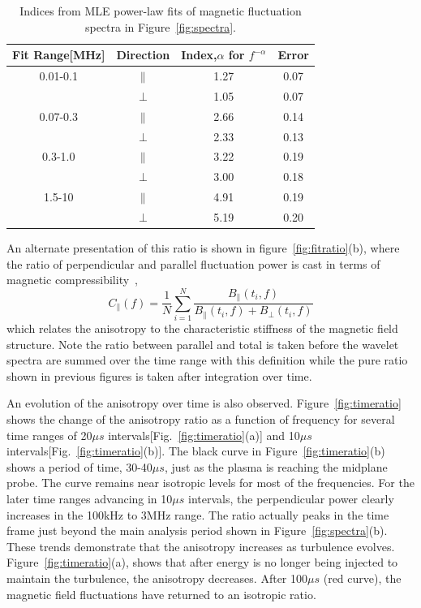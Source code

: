 \documentclass[aip,prl,amsmath,amssymb,reprint,superscriptaddress]{revtex4-1} %
\begin{document}
\begin{table}
\caption{\label{tab:Bindices}Indices from MLE power-law fits of magnetic fluctuation spectra in Figure~\ref{fig:spectra}.}
\begin{tabular}{cccc}
\toprule
Fit Range[MHz]	&	Direction		&	Index,$\alpha$ for $f^{-\alpha}$	&Error\\
\hline
0.01-0.1				& $\parallel$	& 1.27															&0.07\\
								& $\perp$			& 1.05  														&0.07\\
\hline
0.07-0.3				& $\parallel$	& 2.66															&0.14\\
								& $\perp$			& 2.33  														&0.13\\
\hline
0.3-1.0					& $\parallel$	& 3.22															&0.19\\
								& $\perp$			& 3.00  														&0.18\\
\hline
1.5-10					& $\parallel$	& 4.91															&0.19\\
								& $\perp$			& 5.19  														&0.20\\
\hline
\end{tabular}
\end{table}

An alternate presentation of this ratio is shown in figure~\ref{fig:fitratio}(b), where the ratio of perpendicular and parallel fluctuation power is cast in terms of magnetic compressibility~\cite{kiyani13},
\begin{equation}
C_{\parallel}(f) = \frac{1}{N}\sum^{N}_{i=1}\frac{B_{\parallel}(t_{i},f)}{B_{\parallel}(t_{i},f)+B_{\perp}(t_{i},f)}
\label{eq:magcompress}
\end{equation}
which relates the anisotropy to the characteristic stiffness of the magnetic field structure. Note the ratio between parallel and total is taken before the wavelet spectra are summed over the time range with this definition while the pure ratio shown in previous figures is taken after integration over time.

An evolution of the anisotropy over time is also observed. Figure~\ref{fig:timeratio} shows the change of the anisotropy ratio as a function of frequency for several time ranges of 20$\mu s$ intervals[Fig.~\ref{fig:timeratio}(a)] and 10$\mu s$ intervals[Fig.~\ref{fig:timeratio}(b)]. The black curve in Figure~\ref{fig:timeratio}(b) shows a period of time, 30-40$\mu s$, just as the plasma is reaching the midplane probe. The curve remains near isotropic levels for most of the frequencies. For the later time ranges advancing in 10$\mu s$ intervals, the perpendicular power clearly increases in the 100kHz to 3MHz range. The ratio actually peaks in the time frame just beyond the main analysis period shown in Figure~\ref{fig:spectra}(b). These trends demonstrate that the anisotropy increases as turbulence evolves. Figure~\ref{fig:timeratio}(a), shows that after energy is no longer being injected to maintain the turbulence, the anisotropy decreases. After 100$\mu s$ (red curve), the magnetic field fluctuations have returned to an isotropic ratio.
\end{document}

